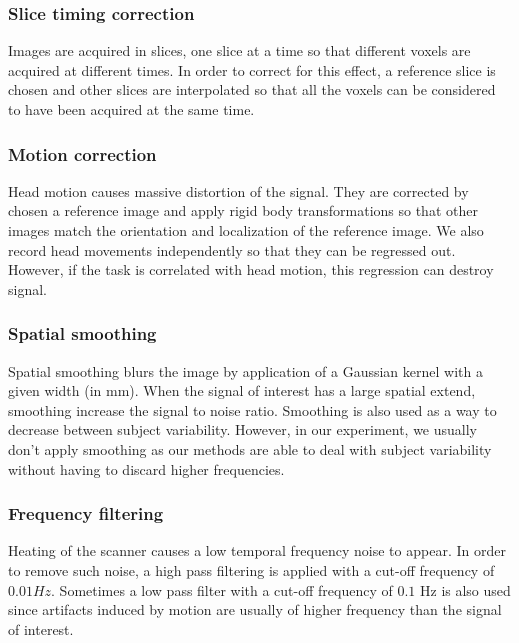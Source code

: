 \subsubsection{Slice timing correction}
Images are acquired in slices, one slice at a time so that different voxels are acquired at different times.
In order to correct for this effect, a reference slice is chosen and other slices are interpolated so that all the voxels can be considered to have been acquired at the same time. 

\subsubsection{Motion correction}
Head motion causes massive distortion of the signal. They are corrected by
chosen a reference image and apply rigid body transformations so that other
images match the orientation and localization of the reference image. We also record head movements independently so that they can be regressed out. However, if the task is correlated with head motion, this regression can destroy signal.

\subsubsection{Spatial smoothing}
Spatial smoothing blurs the image by application of a Gaussian kernel with a given width (in mm). When the signal of interest has a large spatial extend, smoothing increase the signal to noise ratio. 
Smoothing is also used as a way to decrease between subject variability.
However, in our experiment, we usually don't apply smoothing as our methods are able to deal with subject variability without having to discard higher frequencies.


\subsubsection{Frequency filtering}
Heating of the scanner causes a low temporal frequency noise to appear. In order
to remove such noise, a high pass filtering is applied with a cut-off frequency
of $0.01 Hz$. Sometimes a low pass filter with a cut-off frequency of $0.1$ Hz is also used since artifacts induced by motion are usually of higher frequency than the signal of interest.

